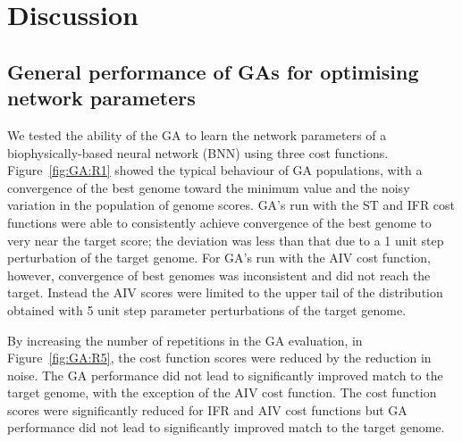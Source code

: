 



\section{Discussion}\label{sec:GA:discussion}

\subsection{General performance of GAs for optimising network
  parameters}\label{sec:GA:general-perf-disc}

We tested the ability of the GA to learn the network parameters of a
biophysically-based neural network (BNN) using three cost
functions. Figure~\ref{fig:GA:R1} showed the typical behaviour of GA
populations, with a convergence of the best genome toward the minimum
value and the noisy variation in the population of genome scores. GA's
run with the ST and IFR cost functions were able to consistently
achieve convergence of the best genome to very near the target score;
the deviation was less than that due to a 1 unit step perturbation of
the target genome. For GA's run with the AIV cost function, however,
convergence of best genomes was inconsistent and did not reach the
target. Instead the AIV scores were limited to the upper tail of the
distribution obtained with 5 unit step parameter perturbations of the
target genome.

\smallskip{}

By increasing the number of repetitions in the GA evaluation, in
Figure~\ref{fig:GA:R5}, the cost function scores were reduced by the
reduction in noise. The GA performance did not lead to significantly
improved match to the target genome, with the exception of the AIV
cost function.  The cost function scores were significantly reduced
for IFR and AIV cost functions but GA performance did not lead to
significantly improved match to the target genome.


\smallskip{}

